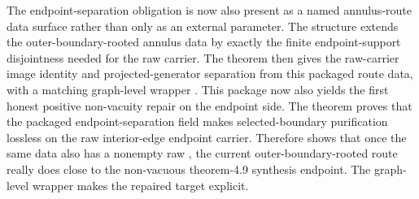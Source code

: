 \documentclass[11pt]{article}
\begin{document}
The endpoint-separation obligation is now also present as a named annulus-route
data surface rather than only as an external parameter.  The structure
extends the outer-boundary-rooted annulus data by exactly the finite
endpoint-support disjointness needed for the raw
 carrier.  The theorem
then gives the raw-carrier image identity and projected-generator separation
from this packaged route data, with a matching graph-level wrapper
.
This package now also yields the first honest positive non-vacuity repair on
the endpoint side.  The theorem
proves that the packaged endpoint-separation field makes selected-boundary
purification lossless on the raw interior-edge endpoint carrier.  Therefore
shows that once the same data also has a nonempty raw
, the current outer-boundary-rooted route
really does close to the non-vacuous theorem-4.9 synthesis endpoint.  The
graph-level wrapper
makes the repaired target explicit.
\end{document}
